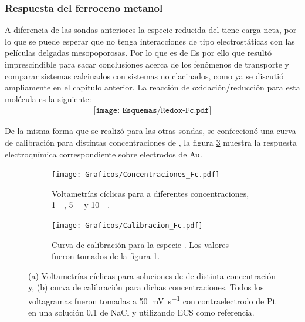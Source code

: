 {{		\subsubsection*{Respuesta del ferroceno metanol}
 	 	 
 	 	  A diferencia de las sondas anteriores la especie reducida del \fc\space tiene carga neta, por lo que se puede esperar que no tenga interacciones de tipo electrostáticas con las películas delgadas mesopoporosas. Por lo que es de  Es por ello que resultó imprescindible para sacar conclusiones acerca de los fenómenos de transporte y comparar sistemas calcinados con sistemas no clacinados, como ya se discutió ampliamente en el capítulo anterior. 
 	 	  La reacción de oxidación/reducción para esta molécula es la siguiente:
 	 				 \begin{equation}
 	 	 				\begin{aligned}
 	 	 				\texttt{[image: Esquemas/Redox-Fc.pdf]}
 	 	 				\end{aligned}
 	 	 			 \end{equation}
 	 	  
 	 	 De la misma forma que se realizó para las otras sondas, se confeccionó una curva de calibración para distintas concentraciones de \fc\space, la figura \ref{Fig:Fc} muestra la respuesta electroquímica correspondiente sobre electrodos de Au.
 	 				
		 		 \begin{figure}[ht]
		 	      \begin{subfigure}[t]{0.495\textwidth}
		          	\texttt{[image: Graficos/Concentraciones\_Fc.pdf]}
		         	\caption{Voltametrías cíclicas para \fc\space a diferentes concentraciones, \SI{1}{\milli\Molar}, \SI{5}{\milli\Molar} y \SI{10}{\milli\Molar}.}
		          	\label{fig:Fc_a}
		      		\end{subfigure}
		      	 \begin{subfigure}[t]{0.495\textwidth}
		          	\texttt{[image: Graficos/Calibracion\_Fc.pdf]}
		         	\caption{Curva de calibración para la especie \fc. Los valores fueron tomados de la figura \ref{fig:Fc_a}.}
		          	\label{fig:Fc_b}
		      		\end{subfigure}
		      	 \caption[Respuesta electroquímica para \fc]{(a) Voltametrías cíclicas para soluciones de \fc\space de distinta concentración y, (b) curva de calibración para dichas concentraciones. Todos los voltagramas fueron tomadas a \SI{50}{\milli\volt\per\second} con contraelectrodo de Pt en una solución \SI{0.1}{\Molar} de NaCl y utilizando ECS como referencia.}
		      	 \label{Fig:Fc}
	      		 \end{figure}

}}
